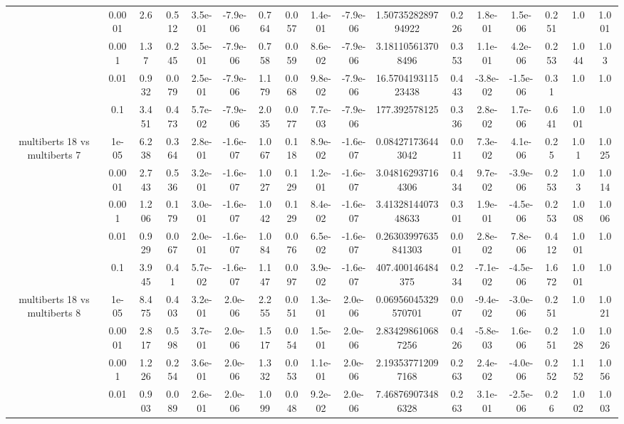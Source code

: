 \begin{tabular}{|c|c|c|c|c|c|c|c|c|c|c|c|c|c|c|c|c|}
 & 0.0001 & 2.6 & 0.512 & 3.5e-01 & -7.9e-06 & 0.764 & 0.057 & 1.4e-01 & -7.9e-06 & 1.5073528289794922 & 0.226 & 1.8e-01 & 1.5e-06 & 0.251 & 1.0 & 1.001 \\
 & 0.001 & 1.37 & 0.245 & 3.5e-01 & -7.9e-06 & 0.758 & 0.059 & 8.6e-02 & -7.9e-06 & 3.181105613708496 & 0.353 & 1.1e-01 & 4.2e-06 & 0.253 & 1.044 & 1.03 \\
 & 0.01 & 0.932 & 0.079 & 2.5e-01 & -7.9e-06 & 1.179 & 0.068 & 9.8e-02 & -7.9e-06 & 16.570419311523438 & 0.443 & -3.8e-02 & -1.5e-06 & 0.31 & 1.0 & 1.0 \\
 & 0.1 & 3.451 & 0.473 & 5.7e-02 & -7.9e-06 & 2.035 & 0.077 & 7.7e-03 & -7.9e-06 & 177.392578125 & 0.336 & 2.8e-02 & 1.7e-06 & 0.641 & 1.001 & 1.0 \\
\hline
\multirow{5}{*}{multiberts 18 vs multiberts 7} & 1e-05 & 6.238 & 0.364 & 2.8e-01 & -1.6e-07 & 1.067 & 0.118 & 8.9e-02 & -1.6e-07 & 0.084271736443042 & 0.011 & 7.3e-02 & 4.1e-06 & 0.25 & 1.01 & 1.025 \\
 & 0.0001 & 2.743 & 0.536 & 3.2e-01 & -1.6e-07 & 1.027 & 0.129 & 1.2e-01 & -1.6e-07 & 3.048162937164306 & 0.434 & 9.7e-02 & -3.9e-06 & 0.253 & 1.03 & 1.014 \\
 & 0.001 & 1.206 & 0.179 & 3.0e-01 & -1.6e-07 & 1.042 & 0.129 & 8.4e-02 & -1.6e-07 & 3.4132814407348633 & 0.301 & 1.9e-01 & -4.5e-06 & 0.253 & 1.008 & 1.006 \\
 & 0.01 & 0.929 & 0.067 & 2.0e-01 & -1.6e-07 & 1.084 & 0.076 & 6.5e-02 & -1.6e-07 & 0.26303997635841303 & 0.001 & 2.8e-02 & 7.8e-06 & 0.412 & 1.001 & 1.0 \\
 & 0.1 & 3.945 & 0.41 & 5.7e-02 & -1.6e-07 & 1.147 & 0.097 & 3.9e-02 & -1.6e-07 & 407.400146484375 & 0.234 & -7.1e-02 & -4.5e-06 & 1.672 & 1.001 & 1.0 \\
\hline
\multirow{5}{*}{multiberts 18 vs multiberts 8} & 1e-05 & 8.475 & 0.403 & 3.2e-01 & 2.0e-06 & 2.255 & 0.051 & 1.3e-01 & 2.0e-06 & 0.06956045329570701 & 0.007 & -9.4e-02 & -3.0e-06 & 0.251 & 1.0 & 1.021 \\
 & 0.0001 & 2.817 & 0.598 & 3.7e-01 & 2.0e-06 & 1.517 & 0.054 & 1.5e-01 & 2.0e-06 & 2.834298610687256 & 0.426 & -5.8e-03 & 1.6e-06 & 0.251 & 1.028 & 1.026 \\
 & 0.001 & 1.226 & 0.254 & 3.6e-01 & 2.0e-06 & 1.332 & 0.053 & 1.1e-01 & 2.0e-06 & 2.193537712097168 & 0.263 & 2.4e-02 & -4.0e-06 & 0.252 & 1.152 & 1.056 \\
 & 0.01 & 0.903 & 0.089 & 2.6e-01 & 2.0e-06 & 1.099 & 0.048 & 9.2e-02 & 2.0e-06 & 7.468769073486328 & 0.263 & 3.1e-01 & -2.5e-06 & 0.26 & 1.002 & 1.003 \\

\end{tabular}
